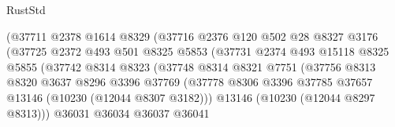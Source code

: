 \begin{lexlean}{RustStd}
\begin{coremodule}
                                    (@37711
                                      @2378
                                      @1614
                                      @8329
                                      (@37716
                                        @2376
                                        @120
                                        @502
                                        @28
                                        @8327
                                        @3176
                                        (@37725
                                          @2372
                                          @493
                                          @501
                                          @8325
                                          @5853
                                          (@37731
                                            @2374
                                            @493
                                            @15118
                                            @8325
                                            @5855
                                            (@37742
                                              @8314
                                              @8323
                                              (@37748
                                                @8314
                                                @8321
                                                @7751
                                                (@37756
                                                  @8313
                                                  @8320
                                                  @3637
                                                  @8296
                                                  @3396
                                                  @37769
                                                  (@37778
                                                    @8306
                                                    @3396
                                                    @37785
                                                    @37657
                                                    @13146
                                                    (@10230 (@12044 @8307 @3182)))
                                                  @13146
                                                  (@10230 (@12044 @8297 @8313)))
                                                @36031
                                                @36034
                                                @36037
                                                @36041

\end{coremodule}
\end{lexlean}
